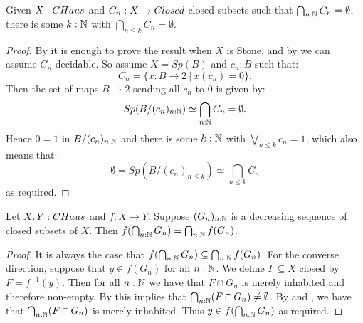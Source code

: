 \begin{lemma}\label{CHausFiniteIntersectionProperty}
  Given $X:\Chaus$ and $C_n:X\to \Closed$ closed subsets such that $\bigcap_{n:\mathbb{N}} C_n =\emptyset$, there is some $k:\mathbb{N}$ 
  with $\bigcap_{n\leq k} C_n  = \emptyset$. 
\end{lemma}
\begin{proof}
  By  it is enough to prove the result when $X$ is Stone, and by  we can assume $C_n$ decidable.
  So assume 
  $X=Sp(B)$ and $c_n:B$ such that: 
  $$C_n = \{x:B\to 2\ |\ x(c_n) = 0\}.$$ 
  Then the set of maps $B\to 2$ sending all $c_n$ to $0$ is given by: 
  $$Sp(B/(c_n)_{n:\N})%
  \simeq \bigcap_{n:\N} C_n = \emptyset .$$
  Hence 
  $0=1$ in $B/(c_n)_{n:\mathbb{N}}$ %
  and there is some $k:\mathbb{N}$ with 
  $\bigvee_{n\leq k} c_n = 1$, which also means that: 
  $$\emptyset = Sp(B/(c_n)_{n\leq k}) %
  \simeq \bigcap_{n\leq k} C_n $$
  as required.
\end{proof}

\begin{corollary}\label{ChausMapsPreserveIntersectionOfClosed}
  Let $X,Y:\CHaus$ and $f:X \to Y$. 
  Suppose $(G_n)_{n:\mathbb{N}}$ is a decreasing sequence of closed subsets of $X$. 
  Then $f(\bigcap_{n:\mathbb{N}} G_n) = \bigcap_{n:\mathbb{N}}f(G_n)$. 
\end{corollary}
\begin{proof}
  It is always the case that $f(\bigcap_{n:\mathbb{N}} G_n) \subseteq \bigcap_{n:\mathbb{N}} f(G_n)$. 
  For the converse direction, suppose that $y \in f(G_n)$ for all $n:\mathbb{N}$. 
  We define $F\subseteq X$ closed by $F=f^{-1}(y)$. 
  Then for all $n:\mathbb{N}$ we have that $F\cap G_n$ is merely inhabited and therefore non-empty. 
  By  this implies that $\bigcap_{n:\mathbb{N}}(F\cap G_n) \neq \emptyset$. 
  By  and , we have that $\bigcap_{n:\mathbb{N}} (F\cap G_n)$ is merely inhabited. Thus $y\in f(\bigcap_{n:\mathbb{N}} G_n)$ as required. 
\end{proof}


